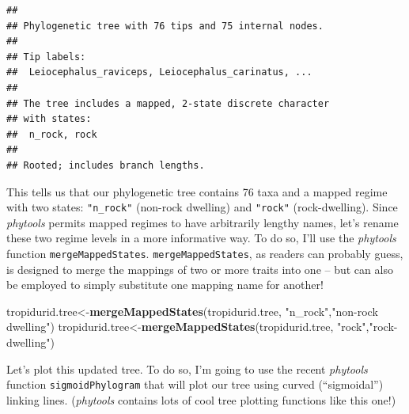 \documentclass[fleqn,10pt,lineno]{wlpeerj} %
\newenvironment{Shaded}{\begin{snugshade}}{\end{snugshade}}
\newcommand{\FunctionTok}[1]{\textcolor[rgb]{0.13,0.29,0.53}{\textbf{#1}}}
\newcommand{\NormalTok}[1]{#1}
\newcommand{\OtherTok}[1]{\textcolor[rgb]{0.56,0.35,0.01}{#1}}
\newcommand{\StringTok}[1]{\textcolor[rgb]{0.31,0.60,0.02}{#1}}
\begin{document}
\begin{verbatim}
## 
## Phylogenetic tree with 76 tips and 75 internal nodes.
## 
## Tip labels:
##  Leiocephalus_raviceps, Leiocephalus_carinatus, ...
## 
## The tree includes a mapped, 2-state discrete character
## with states:
##  n_rock, rock
## 
## Rooted; includes branch lengths.
\end{verbatim}

This tells us that our phylogenetic tree contains 76 taxa and a mapped regime with two states: \texttt{"n\_rock"} (non-rock dwelling) and \texttt{"rock"} (rock-dwelling). Since \emph{phytools} permits mapped regimes to have arbitrarily lengthy names, let's rename these two regime levels in a more informative way. To do so, I'll use the \emph{phytools} function \texttt{mergeMappedStates}. \texttt{mergeMappedStates}, as readers can probably guess, is designed to merge the mappings of two or more traits into one -- but can also be employed to simply substitute one mapping name for another!

\begin{Shaded}
\begin{Highlighting}[]
\NormalTok{tropidurid.tree}\OtherTok{\textless{}{-}}\FunctionTok{mergeMappedStates}\NormalTok{(tropidurid.tree,}
  \StringTok{"n\_rock"}\NormalTok{,}\StringTok{"non{-}rock dwelling"}\NormalTok{)}
\NormalTok{tropidurid.tree}\OtherTok{\textless{}{-}}\FunctionTok{mergeMappedStates}\NormalTok{(tropidurid.tree,}
  \StringTok{"rock"}\NormalTok{,}\StringTok{"rock{-}dwelling"}\NormalTok{)}
\end{Highlighting}
\end{Shaded}

Let's plot this updated tree. To do so, I'm going to use the recent \emph{phytools} function \texttt{sigmoidPhylogram} that will plot our tree using curved (``sigmoidal'') linking lines. (\emph{phytools} contains lots of cool tree plotting functions like this one!)
\end{document}
